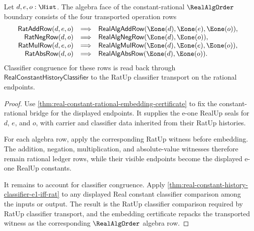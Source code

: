 \begin{theorem}
\label{thm:realalgorder-constant-algebra-row-obligations}
Let $d,e,o:\Hist$. The algebra face of the constant-rational $\RealAlgOrder$
boundary consists of the four transported operation rows
$$
\begin{array}{rcl}
\mathsf{RatAddRow}(d,e,o) &\Longrightarrow&
\mathsf{RealAlgAddRow}(\Eone(d),\Eone(e),\Eone(o)),\\
\mathsf{RatNegRow}(d,o) &\Longrightarrow&
\mathsf{RealAlgNegRow}(\Eone(d),\Eone(o)),\\
\mathsf{RatMulRow}(d,e,o) &\Longrightarrow&
\mathsf{RealAlgMulRow}(\Eone(d),\Eone(e),\Eone(o)),\\
\mathsf{RatAbsRow}(d,o) &\Longrightarrow&
\mathsf{RealAlgAbsRow}(\Eone(d),\Eone(o)).
\end{array}
$$
Classifier congruence for these rows is read back through
$\mathsf{RealConstantHistoryClassifier}$ to the RatUp classifier transport on
the rational endpoints.
\end{theorem}
\begin{proof}
Use \autoref{thm:real-constant-rational-embedding-certificate} to fix the
constant-rational bridge for the displayed endpoints. It supplies the e-one
RealUp seals for $d$, $e$, and $o$, with carrier and classifier data inherited
from their RatUp histories.

For each algebra row, apply the corresponding RatUp witness before embedding.
The addition, negation, multiplication, and absolute-value witnesses therefore
remain rational ledger rows, while their visible endpoints become the
displayed e-one RealUp constants.

It remains to account for classifier congruence. Apply
\autoref{thm:real-constant-history-classifier-e1-iff-rat} to any displayed
Real constant classifier comparison among the inputs or output. The result is
the RatUp classifier comparison required by RatUp classifier transport, and the
embedding certificate repacks the transported witness as the corresponding
$\RealAlgOrder$ algebra row.
\end{proof}

